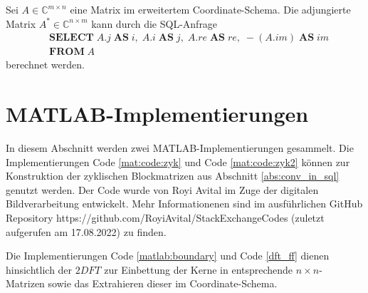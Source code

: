 Sei $A \in \mathbb{C}^{m \times n}$ eine Matrix im erweitertem Coordinate-Schema. Die adjungierte Matrix $A^* \in \mathbb{C}^{n \times m}$ kann durch die SQL-Anfrage
\begin{align*}
    & \mathbf{SELECT} \; A.j \; \mathbf{AS} \; i, \; A.i \; \mathbf{AS} \; j, \; A.re \;\mathbf{AS} \; re, \; -(A.im) \; \mathbf{AS} \; im  \\
    & \mathbf{FROM} \; A
\end{align*}
berechnet werden.
\section{MATLAB-Implementierungen}
\label{app:app_2}

In diesem Abschnitt werden zwei MATLAB-Implementierungen gesammelt. Die Implementierungen Code \ref{mat:code:zyk} und Code \ref{mat:code:zyk2} können zur Konstruktion der zyklischen Blockmatrizen aus Abschnitt \ref{abs:conv_in_sql} genutzt werden. Der Code wurde von Royi Avital im Zuge der digitalen Bildverarbeitung entwickelt. Mehr Informationenen sind im ausführlichen GitHub Repository https://github.com/RoyiAvital/StackExchangeCodes (zuletzt aufgerufen am 17.08.2022) zu finden.



Die Implementierungen Code \ref{matlab:boundary} und Code \ref{dft_ff} dienen hinsichtlich der $\mathrm{2}DFT$ zur Einbettung der Kerne in entsprechende $n \times n$- Matrizen sowie das Extrahieren dieser im Coordinate-Schema.



